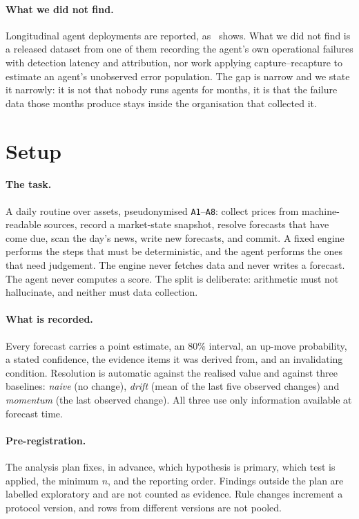 \documentclass[11pt,a4paper]{article}
\begin{document}
\paragraph{What we did not find.} Longitudinal agent deployments are reported,
as~\cite{williams2026pomona} shows. What we did not find is a released dataset
from one of them recording the agent's own operational failures with detection
latency and attribution, nor work applying capture--recapture to estimate an
agent's unobserved error population. The gap is narrow and we state it
narrowly: it is not that nobody runs agents for months, it is that the failure
data those months produce stays inside the organisation that collected it.

\section{Setup}\label{sec:setup}

\paragraph{The task.} A daily routine over \NumAssets{} assets, pseudonymised
\texttt{A1}--\texttt{A8}: collect prices from machine-readable sources, record
a market-state snapshot, resolve forecasts that have come due, scan the day's
news, write new forecasts, and commit. A fixed engine performs the steps that
must be deterministic, and the agent performs the ones that need judgement.
The engine never fetches data and never writes a forecast. The agent never
computes a score. The split is deliberate: arithmetic must not hallucinate,
and neither must data collection.

\paragraph{What is recorded.} Every forecast carries a point estimate, an
$80\%$ interval, an up-move probability, a stated confidence, the evidence
items it was derived from, and an invalidating condition. Resolution is
automatic against the realised value and against three baselines: \emph{naive}
(no change), \emph{drift} (mean of the last five observed changes) and
\emph{momentum} (the last observed change). All three use only information
available at forecast time.

\paragraph{Pre-registration.} The analysis plan fixes, in advance, which
hypothesis is primary, which test is applied, the minimum $n$, and the
reporting order. Findings outside the plan are labelled exploratory and are
not counted as evidence. Rule changes increment a protocol version, and rows
from different versions are not pooled.
\end{document}
